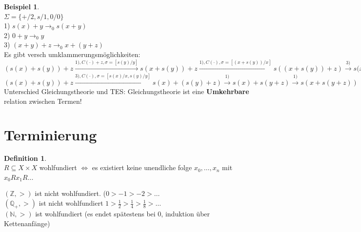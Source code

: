 \documentclass{article}
\theoremstyle{definition}
\newtheorem{beispiel}{Beispiel}[section]
\newtheorem{definition}{Definition}[section]
\begin{document}
	\begin{beispiel}\ \\
	$\Sigma = \{+/2,s/1,0/0\}$\\
	1) $s(x)+y\to_0 s(x+y)$\\
	2) $0+y\to_0 y$\\
	3) $(x+y)+z\to_0 x+(y+z)$\\
	Es gibt versch umklammerungsmöglichkeiten:\\
	$(s(x)+s(y))+z \stackrel{ 1), C(\cdot)+z, \sigma=[s(y)/y] }{ \to } s(x+s(y))+z \stackrel{1), C(\cdot), \sigma=[(x+s(y))/x]}{\longrightarrow} s((x+s(y))+z)\stackrel{3) }{\longrightarrow} s(x+(s(y)+z)\stackrel{1)}{\to}s(x+s(y+z))$\\
	$(s(x)+s(y))+z \stackrel{3), C(\cdot),\sigma=[s(x)/x,s(y)/y] }{ \to }s(x)+(s(y)+z)\stackrel{1)}{\to} s(x)+s(y+z)\stackrel{1)}{\to}s(x+s(y+z))$\\
	Unterschied Gleichungstheorie und TES: Gleichungstheorie ist eine \textbf{Umkehrbare} relation zwischen Termen!
	\end{beispiel}
	\section{Terminierung}
	\begin{definition}\ \\ $R\subseteq X\times X$ wohlfundiert $\iff$ es existiert keine unendliche folge $x_0,\dots,x_n$ mit $x_0Rx_1R\dots$
	\end{definition}\noindent
	$(\mathbb{Z},>)$ ist nicht wohlfundiert. ($0>-1>-2>\dots$\\
	$(\mathbb{Q_+},>)$ ist nicht wohlfundiert $1>\frac{1}{2}>\frac{1}{4}>\frac{1}{8}>\dots$\\
	$(\mathbb{N},>)$ ist wohlfundiert (es endet spätestens bei 0, induktion über Kettenanfänge)
\end{document}

